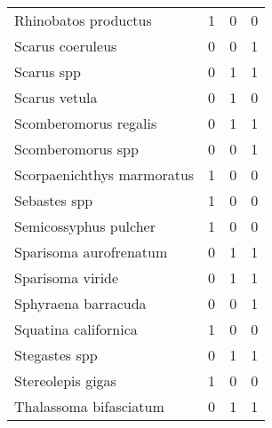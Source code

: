 \begin{longtable}{lrrr}
Rhinobatos productus & 1 & 0 & 0\\
Scarus coeruleus & 0 & 0 & 1\\
\addlinespace
Scarus spp & 0 & 1 & 1\\
Scarus vetula & 0 & 1 & 0\\
Scomberomorus regalis & 0 & 1 & 1\\
Scomberomorus spp & 0 & 0 & 1\\
Scorpaenichthys marmoratus & 1 & 0 & 0\\
\addlinespace
Sebastes spp & 1 & 0 & 0\\
Semicossyphus pulcher & 1 & 0 & 0\\
Sparisoma aurofrenatum & 0 & 1 & 1\\
Sparisoma viride & 0 & 1 & 1\\
Sphyraena barracuda & 0 & 0 & 1\\
\addlinespace
Squatina californica & 1 & 0 & 0\\
Stegastes spp & 0 & 1 & 1\\
Stereolepis gigas & 1 & 0 & 0\\
Thalassoma bifasciatum & 0 & 1 & 1\\*
\end{longtable}